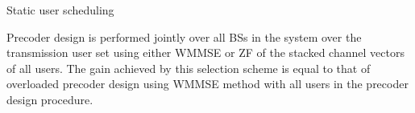 \begin{algorithm}
 \SetAlgoLined
 \DontPrintSemicolon
 \caption{Static user scheduling}
 \label{sus-a1}
\end{algorithm}

Precoder design is performed jointly over all BSs in the system over the transmission user set  using either WMMSE \cite{wmmse_shi} or ZF of the stacked channel vectors of all users. The gain achieved by this selection scheme is equal to that of overloaded precoder design using WMMSE method with all users in the precoder design procedure.